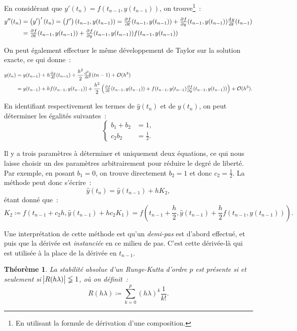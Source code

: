 \documentclass{article}
\newtheorem{thm}{Théorème}[section]
\theoremstyle{definition}
\theoremstyle{remark}
\begin{document}
		En considérant que $y'(t_n) = f(t_{n-1}, y(t_{n-1}))$, on trouve\footnote{En utilisant la formule de dérivation d'une composition.}~:
		\begin{align*}
			y''(t_n) &= \left(y'\right)'(t_n) = \left(f'\right)(t_{n-1}, y(t_{n-1})) = \pd ft(t_{n-1}, y(t_{n-1}))
							+ \pd fy(t_{n-1}, y(t_{n-1}))\od yt(t_{n-1}) \\
			         &= \pd ft(t_{n-1}, y(t_{n-1})) + \pd fy(t_{n-1}, y(t_{n-1}))f(t_{n-1}, y(t_{n-1}))
		\end{align*}

		On peut également effectuer le même développement de Taylor sur la solution exacte, ce qui donne~:
		\begin{align*}
			y(t_n) &= y(t_{n-1}) + h\od yt(t_{n-1}) + \frac {h^2}2\od[2] yt(t{n-1}) + \mathcal O(h^3) \\
			       &= y(t_{n-1}) + hf(t_{n-1}, y(t_{n-1})) + \frac {h^2}2\left(\pd ft(t_{n-1}, y(t_{n-1}))
				   		+ f(t_{n-1}, y(t_{n-1})\pd fy(t_{n-1}, y(t_{n-1}))\right) + \mathcal O(h^3).
		\end{align*}

		En identifiant respectivement les termes de $\widehat y(t_n)$ et de $y(t_n)$, on peut déterminer les égalités suivantes~:
		\[\begin{cases}
			b_1 + b_2 &= 1, \\
			c_2b_2 &= \frac 12.
		\end{cases}\]

		Il y a trois paramètres à déterminer et uniquement deux équations, ce qui nous laisse choisir un des paramètres arbitrairement pour réduire le degré
		de liberté. Par exemple, en posant $b_1 = 0$, on trouve directement $b_2 = 1$ et donc $c_2 = \frac 12$. La méthode peut donc s'écrire~:
		\[\widehat y(t_n) = \widehat y(t_{n-1}) + hK_2,\]
		étant donné que~:
		\[K_2 \coloneqq f\left(t_{n-1} + c_2h, \widehat y(t_{n-1}) + hc_2K_1\right)
		= f\left(t_{n-1} + \frac h2, \widehat y(t_{n-1}) + \frac h2f(t_{n-1}, y(t_{n-1}))\right).\]

		Une interprétation de cette méthode est qu'un \emph{demi-pas} est d'abord effectué, et puis que la dérivée est \emph{instanciée} en ce milieu de pas.
		C'est cette dérivée-là qui est utilisée à la place de la dérivée en $t_{n-1}$.

		\begin{thm} La stabilité absolue d'un Runge-Kutta d'ordre $p$ est présente si et seulement si $\abs {R(h\lambda)} \lneqq 1$, où on définit~:
		\[R(h\lambda) \coloneqq \sum_{k=0}^p(h\lambda)^k\frac 1{k!}.\]
		\end{thm}
\end{document}
